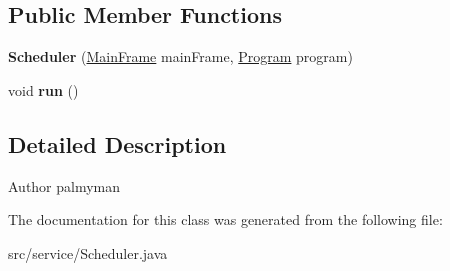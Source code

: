 \subsection*{Public Member Functions}
\begin{DoxyCompactItemize}
\item 
\hypertarget{classservice_1_1Scheduler_a86fb1f1d344a256e001822082c36362e}{{\bfseries Scheduler} (\hyperlink{classgui_1_1MainFrame}{Main\-Frame} main\-Frame, \hyperlink{classmodel_1_1Program}{Program} program)}\label{classservice_1_1Scheduler_a86fb1f1d344a256e001822082c36362e}

\item 
\hypertarget{classservice_1_1Scheduler_a305649c6c654e1aff685e990d31a9e92}{void {\bfseries run} ()}\label{classservice_1_1Scheduler_a305649c6c654e1aff685e990d31a9e92}

\end{DoxyCompactItemize}


\subsection{Detailed Description}
\begin{DoxyAuthor}{Author}
palmyman 
\end{DoxyAuthor}


The documentation for this class was generated from the following file\-:\begin{DoxyCompactItemize}
\item 
src/service/Scheduler.\-java\end{DoxyCompactItemize}
